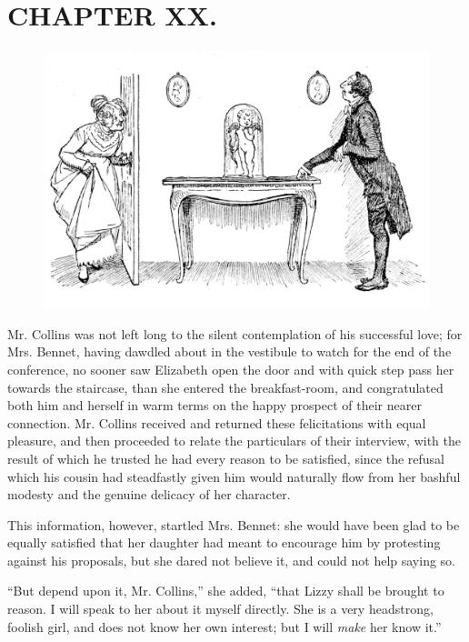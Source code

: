 \chapter{CHAPTER XX.}


\begin{figure}[htbp]
    \centering
    \includegraphics[width=\textwidth]{illustrations/i_168_a.jpg}
\end{figure}


Mr. Collins was not left long to the silent contemplation of his successful love; for Mrs. Bennet, having dawdled about in the vestibule to watch for the end of the conference, no sooner saw Elizabeth open the door and with quick step pass her towards the staircase, than she entered the breakfast-room, and congratulated both him and herself in warm terms on the happy prospect of their nearer connection. Mr. Collins received and returned these felicitations with equal pleasure, and then proceeded to relate the particulars of their interview, with the result of which he trusted he had every reason to be satisfied, since the refusal which his cousin had steadfastly given him would naturally flow from her bashful modesty and the genuine delicacy of her character.

This information, however, startled Mrs. Bennet: she would have been glad to be equally satisfied that her daughter had meant to encourage him by protesting against his proposals, but she dared not believe it, and could not help saying so.

``But depend upon it, Mr. Collins,'' she added, ``that Lizzy shall be brought to reason. I will speak to her about it myself directly. She is a very headstrong, foolish girl, and does not know her own interest; but I will \textit{make} her know it.''


